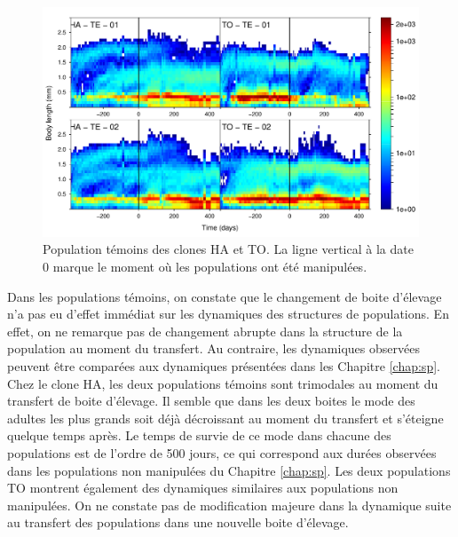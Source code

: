 \begin{figure}[!ht]
\begin{center}
\includegraphics[width=1\textwidth]{1_CorpsDeThese/Resumes/Fig/SM04}
\caption[Population
témoins des clones HA et TO]{Population
témoins des clones HA et TO. La ligne vertical à la date 0 marque le moment où
les populations ont été manipulées.}
\label{fig:SM3}
\end{center}
\end{figure}

Dans les populations témoins, on constate que le changement de boite d'élevage
n'a pas eu d'effet immédiat sur les dynamiques des structures de populations. En
effet, on ne remarque pas de changement abrupte dans la structure de la
population au moment du transfert. Au contraire, les dynamiques observées
peuvent être comparées aux dynamiques présentées dans les Chapitre
\ref{chap:sp}. Chez le clone HA, les deux populations témoins sont trimodales au
moment du transfert de boite d'élevage. Il semble que dans les deux boites le
mode des adultes les plus grands soit déjà décroissant au moment du transfert et
s'éteigne quelque temps après. Le temps de survie de ce mode dans chacune des
populations est de l'ordre de 500 jours, ce qui correspond aux durées observées
dans les populations non manipulées du Chapitre \ref{chap:sp}. Les deux
populations TO montrent également des dynamiques similaires aux populations non
manipulées. On ne constate pas de modification majeure dans la dynamique suite
au transfert des populations dans une nouvelle boite d'élevage. 

